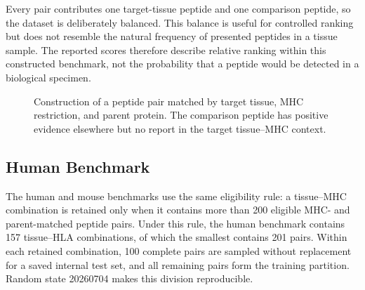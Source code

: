 Every pair contributes one target-tissue peptide and one comparison peptide, so the dataset is deliberately balanced. This balance is useful for controlled ranking but does not resemble the natural frequency of presented peptides in a tissue sample. The reported scores therefore describe relative ranking within this constructed benchmark, not the probability that a peptide would be detected in a biological specimen.

\begin{figure}[t]
\centering
{}
\caption{Construction of a peptide pair matched by target tissue, MHC restriction, and parent protein. The comparison peptide has positive evidence elsewhere but no report in the target tissue--MHC context.}
\label{fig:pair-construction}
\end{figure}

\subsection{Human Benchmark}

The human and mouse benchmarks use the same eligibility rule: a tissue--MHC combination is retained only when it contains more than 200 eligible MHC- and parent-matched peptide pairs. Under this rule, the human benchmark contains 157 tissue--HLA combinations, of which the smallest contains 201 pairs. Within each retained combination, 100 complete pairs are sampled without replacement for a saved internal test set, and all remaining pairs form the training partition. Random state 20260704 makes this division reproducible.

